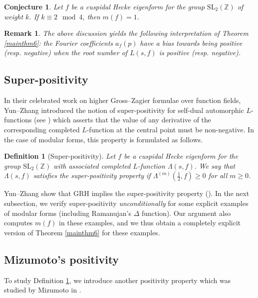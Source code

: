 \documentclass[12pt,reqno]{amsart}
\newtheorem{conjecture}[theorem]{Conjecture}
\newtheorem{remark}[theorem]{Remark}
\newtheorem{definition}[theorem]{Definition}
\theoremstyle{definition}
\numberwithin{equation}{section}
\newcommand{\SL}{\mathrm{SL}}
\begin{document}
\begin{conjecture}
Let $f$ be a cuspidal Hecke eigenform for the group $\SL_2(\mathbb Z)$ of weight $k$. If $k \equiv 2 \mod 4$,  then $m(f)=1$. 
\end{conjecture}


\begin{remark}
The above discussion yields the following interpretation of Theorem \ref{mainthm6}: the Fourier coefficients $a_f(p)$ have a bias towards being positive (resp. negative) when the root number of  $L(s, f)$ is positive (resp. negative). 
\end{remark}

\subsection{Super-positivity}

In their celebrated work on higher Gross--Zagier formulae over function fields, Yun--Zhang introduced the notion of super-positivity for self-dual automorphic $L$-functions (see \cite[Appendix B]{YZ17}) which asserts that the value of any derivative of the corresponding completed $L$-function at the central point must be non-negative. In the case of modular forms, this property is formulated as follows. 

\begin{definition}[Super-positivity] \label{sp}
Let $f$ be a cuspidal Hecke eigenform for the group $\SL_2(\mathbb Z)$ with associated completed $L$-function $\Lambda(s, f)$. We say that $\Lambda(s, f)$ satisfies the super-positivity property if $\Lambda^{(m)} \left( \frac{1}{2}, f \right) \geq 0$ for all $m \geq 0$. 
\end{definition}

 Yun--Zhang show that GRH implies the super-positivity property (\cite[Theorem B.2]{YZ17}). In the next subsection, we verify super-positivity \textit{unconditionally} for some explicit examples of modular forms (including Ramanujan's $\Delta$ function). Our argument also computes $m(f)$ in these examples, and we thus obtain a completely explicit version of Theorem \ref{mainthm6} for these examples. 


\subsection{Mizumoto's positivity} \label{miz}
To study Definition \ref{sp}, we introduce another positivity property which was studied by Mizumoto in \cite{Miz99}. 
\end{document}
